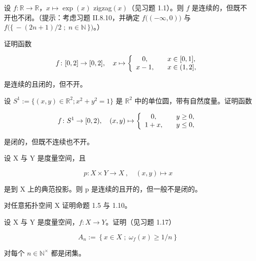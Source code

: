 \begin{exercises}
设 $f: \mathbb{R} \to \mathbb{R}$，$x \mapsto \exp(x)$ zigzag$(x)$（见习题 1.1）。则 $f$ 是连续的，但既不开也不闭。（提示：考虑习题 II.8.10，并确定 $f\big((-\infty,0)\big)$ 与 $f\big(\{\, -(2n+1)/2 \;;\; n\in\mathbb{N}\,\}\big)$。）

\item[16.]

证明函数

\begin{equation*}
f\colon[0,2]\to[0,2],\quad x\mapsto\left\{\begin{array}{c l}{0,}&{\quad x\in[0,1],}\\ {x-1,}&{\quad x\in(1,2],}\\ \end{array}\right.
\end{equation*}

是连续的且闭的，但不开。

\item[17.]

设 $ S^1 := \{(x, y) \in \mathbb{R}^2; x^2 + y^2 = 1\} $ 是 $ \mathbb{R}^2 $ 中的单位圆，带有自然度量。证明函数

\begin{equation*}
f\colon S^{1}\to[0,2),\quad(x,y)\mapsto\left\{\begin{array}{c l}{0,}&{\quad y\geq0,}\\ {1+x,}&{\quad y\leq0,}\\ \end{array}\right.
\end{equation*}

是闭的，但既不连续也不开。

\item[18.]

设 X 与 Y 是度量空间，且

\[
p\colon X\times Y\to X~,\quad(x,y)\mapsto x
\]

是到 X 上的典范投影。则 p 是连续的且开的，但一般不是闭的。

\item[19.]

对任意拓扑空间 X 证明命题 1.5 与 1.10。

\item[20.]

设 X 与 Y 是度量空间，$ f: X \to Y $。证明（见习题 1.17）

\[
A_{n}:=\left\{x\in X\;;\;\omega_{f}(x)\geq1/n\right\}
\]

对每个 $ n \in \mathbb{N}^{\times} $ 都是闭集。

\item[21.]


\end{exercises}
